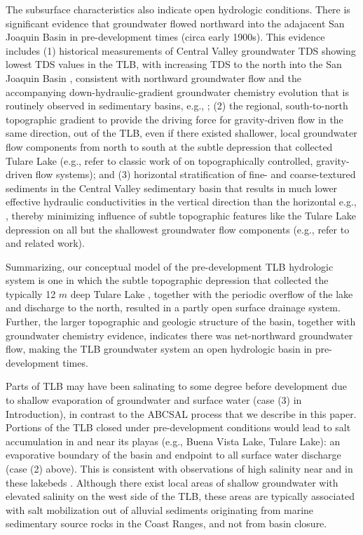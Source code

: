The subsurface characteristics also indicate open hydrologic conditions. There is significant evidence that groundwater flowed northward into the adajacent San Joaquin Basin in pre-development times (circa early 1900s). This evidence includes (1) historical measurements of Central Valley groundwater TDS showing lowest TDS values in the TLB, with increasing TDS to the north into the San Joaquin Basin \citep[Table 23]{mendenhall1916ground}, consistent with northward groundwater flow and the accompanying down-hydraulic-gradient groundwater chemistry evolution that is routinely observed in sedimentary basins, e.g., \citep{palmer1984geochemical}; (2) the regional, south-to-north topographic gradient to provide the driving force for gravity-driven flow in the same direction, out of the TLB, even if there existed shallower, local groundwater flow components from north to south at the subtle depression that collected Tulare Lake (e.g., refer to classic work of \cite{toth1970conceptual} on topographically controlled, gravity-driven flow systems); and (3) horizontal stratification of fine- and coarse-textured sediments in the Central Valley sedimentary basin that results in much lower effective hydraulic conductivities in the vertical direction than the horizontal e.g., \citep{weissmann2002dispersion, Faunted.2009}, thereby minimizing influence of subtle topographic features like the Tulare Lake depression on all but the shallowest groundwater flow components (e.g., refer to \cite{toth1970conceptual} and related work).

Summarizing, our conceptual model of the pre-development TLB hydrologic system is one in which the subtle topographic depression that collected the typically 12 $m$ deep Tulare Lake \citep{preston1990tulare}, together with the periodic overflow of the lake and discharge to the north, resulted in a partly open surface drainage system. Further, the larger topographic and geologic structure of the basin, together with groundwater chemistry evidence, indicates there was net-northward groundwater flow, making the TLB groundwater system an open hydrologic basin in pre-development times.

Parts of TLB may have been salinating to some degree before development due to shallow evaporation of groundwater and surface water (case (3) in Introduction), in contrast to the ABCSAL process that we describe in this paper. Portions of the TLB closed under pre-development conditions would lead to salt accumulation in and near its playas (e.g., Buena Vista Lake, Tulare Lake): an evaporative boundary of the basin and endpoint to all surface water discharge (case (2) above). This is consistent with observations of high salinity near and in these lakebeds \citep{Hansen2018, Fujii1995}. Although there exist local areas of shallow groundwater with elevated salinity on the west side of the TLB, these areas are typically associated with salt mobilization out of alluvial sediments originating from marine sedimentary source rocks in the Coast Ranges, and not from basin closure.

